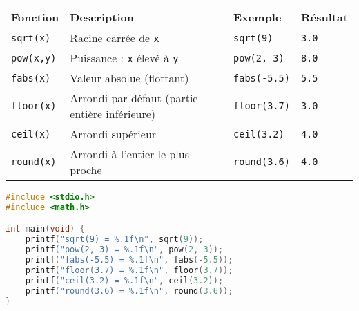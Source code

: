 \begin{center}
	\begin{tabular}{|l|l|l|l|}
		\hline
		Fonction          & Description                                    & Exemple             & Résultat     \\
		\hline
		\texttt{sqrt(x)}  & Racine carrée de \texttt{x}                    & \texttt{sqrt(9)}    & \texttt{3.0} \\
		\texttt{pow(x,y)} & Puissance : \texttt{x} élevé à \texttt{y}      & \texttt{pow(2, 3)}  & \texttt{8.0} \\
		\texttt{fabs(x)}  & Valeur absolue (flottant)                      & \texttt{fabs(-5.5)} & \texttt{5.5} \\
		\texttt{floor(x)} & Arrondi par défaut (partie entière inférieure) & \texttt{floor(3.7)} & \texttt{3.0} \\
		\texttt{ceil(x)}  & Arrondi supérieur                              & \texttt{ceil(3.2)}  & \texttt{4.0} \\
		\texttt{round(x)} & Arrondi à l’entier le plus proche              & \texttt{round(3.6)} & \texttt{4.0} \\
		\hline
	\end{tabular}
\end{center}
\begin{lstlisting}[language=c]
#include <stdio.h>
#include <math.h>

int main(void) {
    printf("sqrt(9) = %.1f\n", sqrt(9));
    printf("pow(2, 3) = %.1f\n", pow(2, 3));
    printf("fabs(-5.5) = %.1f\n", fabs(-5.5));
    printf("floor(3.7) = %.1f\n", floor(3.7));
    printf("ceil(3.2) = %.1f\n", ceil(3.2));
    printf("round(3.6) = %.1f\n", round(3.6));
}
\end{lstlisting}